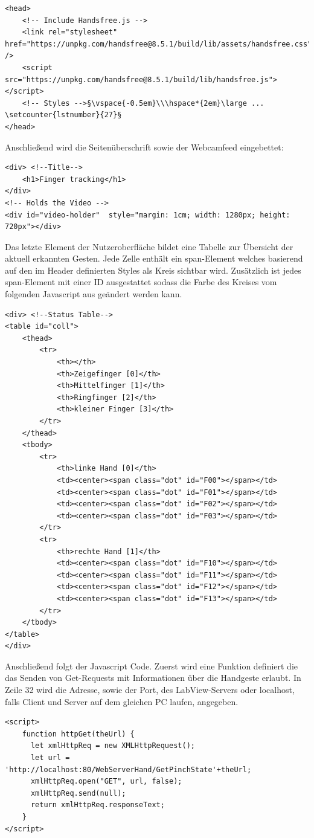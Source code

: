 \documentclass[a4paper,12pt,final]{article} %
\numberwithin{equation}{section} %
\numberwithin{figure}{section} %
\numberwithin{table}{section} %
\begin{document}
 \begin{lstlisting}[firstnumber=3]
<head>
    <!-- Include Handsfree.js -->
    <link rel="stylesheet" href="https://unpkg.com/handsfree@8.5.1/build/lib/assets/handsfree.css" />
    <script src="https://unpkg.com/handsfree@8.5.1/build/lib/handsfree.js"></script>
    <!-- Styles -->§\vspace{-0.5em}\\\hspace*{2em}\large ... \setcounter{lstnumber}{27}§
</head>
 \end{lstlisting}

 Anschließend wird die Seitenüberschrift sowie der Webcamfeed eingebettet:
 
\begin{lstlisting}[firstnumber=30]
<div> <!--Title-->
	<h1>Finger tracking</h1>
</div>
<!-- Holds the Video -->
<div id="video-holder"  style="margin: 1cm; width: 1280px; height: 720px"></div> 
\end{lstlisting}

Das letzte Element der Nutzeroberfläche bildet eine Tabelle zur Übersicht der aktuell erkannten Gesten. Jede Zelle enthält ein span-Element welches basierend auf den im Header definierten Styles als Kreis sichtbar wird. Zusätzlich ist jedes span-Element mit einer ID ausgestattet sodass die Farbe des Kreises vom folgenden Javascript aus geändert werden kann.

\begin{lstlisting}[firstnumber=38]
<div> <!--Status Table-->
<table id="coll">
	<thead>
		<tr>
			<th></th>
			<th>Zeigefinger [0]</th>
			<th>Mittelfinger [1]</th>
			<th>Ringfinger [2]</th>
			<th>kleiner Finger [3]</th>
		</tr>
	</thead>
	<tbody>
		<tr>
			<th>linke Hand [0]</th>
			<td><center><span class="dot" id="F00"></span></td>
			<td><center><span class="dot" id="F01"></span></td>
			<td><center><span class="dot" id="F02"></span></td>
			<td><center><span class="dot" id="F03"></span></td>
		</tr>
		<tr>
			<th>rechte Hand [1]</th>
			<td><center><span class="dot" id="F10"></span></td>
			<td><center><span class="dot" id="F11"></span></td>
			<td><center><span class="dot" id="F12"></span></td>
			<td><center><span class="dot" id="F13"></span></td>
		</tr>
	</tbody>
</table>
</div>
\end{lstlisting}

Anschließend folgt der Javascript Code. Zuerst wird eine Funktion definiert die das Senden von Get-Requests mit Informationen über die Handgeste erlaubt. In Zeile 32 wird die Adresse, sowie der Port, des LabView-Servers oder localhost, falls Client und Server auf dem gleichen PC laufen, angegeben.
\begin{lstlisting}[firstnumber=67]
<script>
	function httpGet(theUrl) {
	  let xmlHttpReq = new XMLHttpRequest();
      let url = 'http://localhost:80/WebServerHand/GetPinchState'+theUrl; 
	  xmlHttpReq.open("GET", url, false);
	  xmlHttpReq.send(null);
	  return xmlHttpReq.responseText;
	}
</script>
\end{lstlisting}
\end{document}
